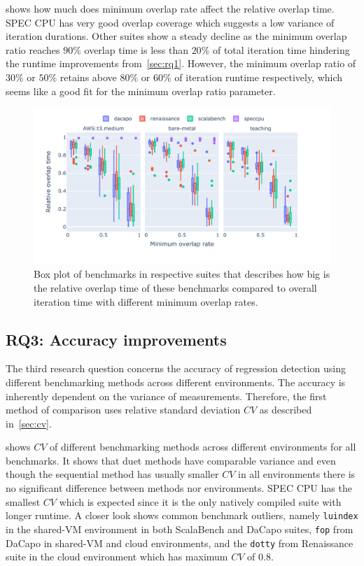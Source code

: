  shows how much does minimum overlap rate affect the relative overlap time.
SPEC CPU has very good overlap coverage which suggests a low variance of iteration durations.
Other suites show a steady decline as the minimum overlap ratio reaches $90\%$ overlap time is less than $20\%$ of total iteration time hindering the runtime improvements from~\cref{sec:rq1}.
However, the minimum overlap ratio of $30\%$ or $50\%$ retains above $80\%$ or $60\%$ of iteration runtime respectively, which seems like a good fit for the minimum overlap ratio parameter.

\begin{figure}
	\centering
	\includegraphics[width=1\linewidth]{./figures/relative_overlap_time.pdf}
	\caption{
		Box plot of benchmarks in respective suites that describes how big is the relative overlap time of these benchmarks compared to overall iteration time with different minimum overlap rates.
	}
	\label{fig:relative_overlap_time}
\end{figure}


\subsection{RQ3: Accuracy improvements}
\label{sec:rq3}

The third research question concerns the accuracy of regression detection using different benchmarking methods across different environments.
The accuracy is inherently dependent on the variance of measurements.
Therefore, the first method of comparison uses relative standard deviation $CV$ as described in~\cref{sec:cv}.

 shows $CV$ of different benchmarking methods across different environments for all benchmarks.
It shows that duet methods have comparable variance and even though the sequential method has usually smaller $CV$ in all environments there is no significant difference between methods nor environments.
SPEC CPU has the smallest $CV$ which is expected since it is the only natively compiled suite with longer runtime.
A closer look shows common benchmark outliers, namely \lstinline{luindex} in the \mbox{shared-VM} environment in both ScalaBench and DaCapo suites, \lstinline{fop} from DaCapo in \mbox{shared-VM} and cloud environments, and the \lstinline{dotty} from Renaissance suite in the cloud environment which has maximum $CV$ of $0.8$.

